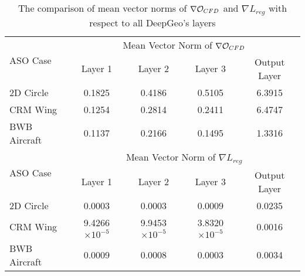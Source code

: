 \begin{table}[htbp]
  \centering
  \caption{The comparison of mean vector norms of $\nabla \mathcal{O}_{CFD}$ and $\nabla L_{reg}$ with respect to all DeepGeo's layers}
    \begin{tabular}{lcccc}
    \hline
    \multirow{2}[4]{*}{ASO Case} & \multicolumn{4}{c}{Mean Vector Norm of $\nabla \mathcal{O}_{CFD}$}\\
\cline{2-5}           & Layer 1 & Layer 2 & Layer 3 & Output Layer\\
    \hline
    2D Circle & 0.1825 & 0.4186 & 0.5105 & 6.3915\\
    CRM Wing & 0.1254 & 0.2814 & 0.2411 & 6.4747 \\
    BWB Aircraft & 0.1137 & 0.2166 & 0.1495 & 1.3316\\
    \hline
    \multirow{2}[4]{*}{ASO Case} & \multicolumn{4}{c}{Mean Vector Norm of $\nabla L_{reg}$}\\
\cline{2-5}           & Layer 1 & Layer 2 & Layer 3 & Output Layer\\
    \hline
    2D Circle & 0.0003 & 0.0003 & 0.0009 & 0.0235\\
    CRM Wing & 9.4266$\times 10^{-5}$ & 9.9453$\times 10^{-5}$ & 3.8320$\times 10^{-5}$ & 0.0016 \\
    BWB Aircraft & 0.0009 & 0.0008 & 0.0003 & 0.0034\\
    \hline
    \end{tabular}%
  \label{ch5:tab:gradient_norm}%
\end{table}%